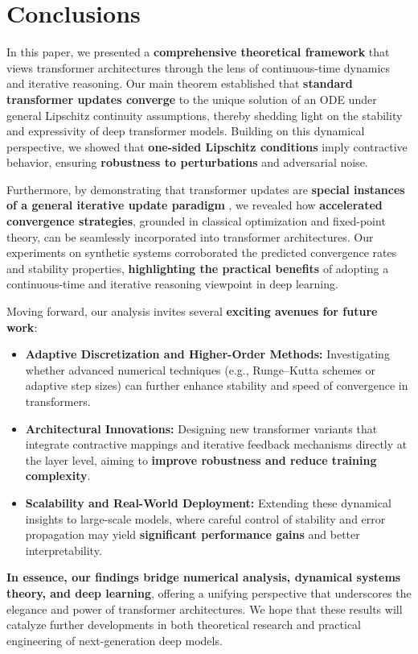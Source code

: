 \section{Conclusions}
\label{sec:conclusion}
In this paper, we presented a \textbf{comprehensive theoretical framework} that views transformer architectures through the lens of continuous-time dynamics and iterative reasoning. Our main theorem established that \textbf{standard transformer updates converge} to the unique solution of an ODE under general Lipschitz continuity assumptions, thereby shedding light on the stability and expressivity of deep transformer models. Building on this dynamical perspective, we showed that \textbf{one-sided Lipschitz conditions} imply contractive behavior, ensuring \textbf{robustness to perturbations} and adversarial noise.

Furthermore, by demonstrating that transformer updates are \textbf{special instances of a general iterative update paradigm} \citep{feinashley2025iterate}, we revealed how \textbf{accelerated convergence strategies}, grounded in classical optimization and fixed-point theory, can be seamlessly incorporated into transformer architectures. Our experiments on synthetic systems corroborated the predicted convergence rates and stability properties, \textbf{highlighting the practical benefits} of adopting a continuous-time and iterative reasoning viewpoint in deep learning.

Moving forward, our analysis invites several \textbf{exciting avenues for future work}:
\begin{itemize}
    \item \textbf{Adaptive Discretization and Higher-Order Methods:} Investigating whether advanced numerical techniques (e.g., Runge--Kutta schemes or adaptive step sizes) can further enhance stability and speed of convergence in transformers.
    \item \textbf{Architectural Innovations:} Designing new transformer variants that integrate contractive mappings and iterative feedback mechanisms directly at the layer level, aiming to \textbf{improve robustness and reduce training complexity}.
    \item \textbf{Scalability and Real-World Deployment:} Extending these dynamical insights to large-scale models, where careful control of stability and error propagation may yield \textbf{significant performance gains} and better interpretability.
\end{itemize}

\noindent \textbf{In essence, our findings bridge numerical analysis, dynamical systems theory, and deep learning}, offering a unifying perspective that underscores the elegance and power of transformer architectures. We hope that these results will catalyze further developments in both theoretical research and practical engineering of next-generation deep models.